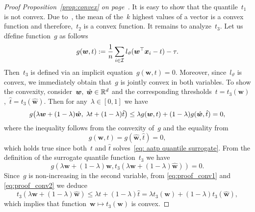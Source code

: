 \propconvex*
\begin{proof}[Proof Proposition~\ref{prop:convex} on page~\pageref{prop:convex}]
  It is easy to show that the quantile~$t_1$ is not convex. Due to~\cite{lapin2015top}, the mean of the~$k$ highest values of a vector is a convex function and therefore,~$t_2$ is a convex function. It remains to analyze~$t_3$. Let us dfefine function~$g$ as follows
  \begin{equation*}
    g(\bm{w},t) := \frac{1}{n} \sum_{i \in \mathcal{I}} l_{\vartheta}(\bm{w}^\top \bm{x}_i - t) - \tau.
  \end{equation*}  
  Then~$t_3$ is defined via an implicit equation~$g(\bm{w},t) = 0.$ Moreover, since~$l_{\vartheta}$ is convex, we immediately obtain that~$g$ is jointly convex in both variables. To show the convexity, consider~$\bm{w}, \; \hat{\bm{w}} \in \mathbb{R}^d$ and the corresponding thresholds~$t = t_3(\bm{w})$,~$\hat{t} = t_3(\hat{\bm{w}})$. Then for any~$\lambda\in[0,1]$ we have 
  \begin{equation}\label{eq:proof_conv1}
    g\Brac{\lambda \bm{w} + (1 - \lambda)\hat{\bm{w}}, \;\lambda t + (1 - \lambda)\hat{t}}
    \le \lambda g(\bm{w}, t) + (1 - \lambda) g(\hat{\bm{w}}, \hat{t}) = 0,
  \end{equation}
  where the inequality follows from the convexity of~$g$ and the equality from
  \begin{equation*}
    g(\bm{w}, t) = g(\hat{\bm{w}}, \hat{t}) = 0,
  \end{equation*}
  which holds true since both~$t$ and $\hat{t}$ solves~\eqref{eq: aatp quantile surrogate}. From the definition of the surrogate quantile function~$t_3$ we have
  \begin{equation}\label{eq:proof_conv2}
    g(\lambda\bm{w} + (1-\lambda)\hat{\bm{w}}, t_3(\lambda\bm{w} + (1-\lambda)\hat{\bm{w}})) = 0.
  \end{equation}
  Since~$g$ is non-increasing in the second variable, from \eqref{eq:proof_conv1} and \eqref{eq:proof_conv2} we deduce
  \begin{equation*}
    t_3(\lambda\bm{w} + (1-\lambda)\hat{\bm{w}})
    \le \lambda t + (1-\lambda)\hat{t}
    =   \lambda t_3(\bm{w})+(1-\lambda) t_3(\hat{\bm{w}}),
  \end{equation*}
  which implies that function~$\bm{w}\mapsto t_3(\bm{w})$ is convex.
\end{proof}

